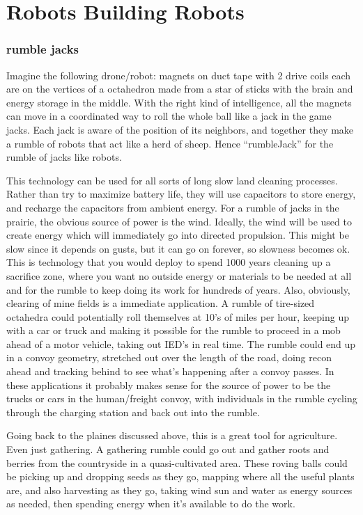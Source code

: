 \section{Robots Building Robots}\label{robots-building-robots}

\subsubsection{rumble jacks}\label{rumble-jacks}

Imagine the following drone/robot: magnets on duct tape with 2 drive
coils each are on the vertices of a octahedron made from a star of
sticks with the brain and energy storage in the middle. With the right
kind of intelligence, all the magnets can move in a coordinated way to
roll the whole ball like a jack in the game jacks. Each jack is aware of
the position of its neighbors, and together they make a rumble of robots
that act like a herd of sheep. Hence ``rumbleJack'' for the rumble of
jacks like robots.

This technology can be used for all sorts of long slow land cleaning
processes. Rather than try to maximize battery life, they will use
capacitors to store energy, and recharge the capacitors from ambient
energy. For a rumble of jacks in the prairie, the obvious source of
power is the wind. Ideally, the wind will be used to create energy which
will immediately go into directed propulsion. This might be slow since
it depends on gusts, but it can go on forever, so slowness becomes ok.
This is technology that you would deploy to spend 1000 years cleaning up
a sacrifice zone, where you want no outside energy or materials to be
needed at all and for the rumble to keep doing its work for hundreds of
years. Also, obviously, clearing of mine fields is a immediate
application. A rumble of tire-sized octahedra could potentially roll
themselves at 10's of miles per hour, keeping up with a car or truck and
making it possible for the rumble to proceed in a mob ahead of a motor
vehicle, taking out IED's in real time. The rumble could end up in a
convoy geometry, stretched out over the length of the road, doing recon
ahead and tracking behind to see what's happening after a convoy passes.
In these applications it probably makes sense for the source of power to
be the trucks or cars in the human/freight convoy, with individuals in
the rumble cycling through the charging station and back out into the
rumble.

Going back to the plaines discussed above, this is a great tool for
agriculture. Even just gathering. A gathering rumble could go out and
gather roots and berries from the countryside in a quasi-cultivated
area. These roving balls could be picking up and dropping seeds as they
go, mapping where all the useful plants are, and also harvesting as they
go, taking wind sun and water as energy sources as needed, then spending
energy when it's available to do the work.

